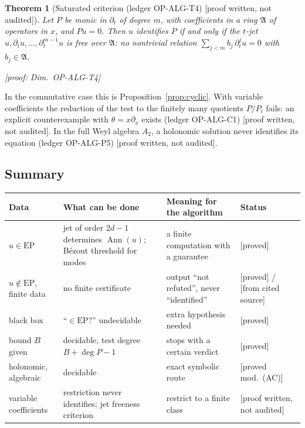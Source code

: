 \documentclass[11pt]{article}
\theoremstyle{plain}
\newtheorem{theorem}{Theorem}[section]
\theoremstyle{definition}
\theoremstyle{remark}
\DeclareMathOperator{\Ann}{Ann}             %
\newcommand{\EP}{\mathrm{EP}}               %
\newcommand{\badge}[2]{\textcolor{#1}{\textsf{\footnotesize[#2]}}}
\newcommand{\proved}[1][]{\badge{cC}{proved#1}}
\newcommand{\modulo}[1]{\badge{cD}{proved mod.\ #1}}
\newcommand{\led}[1]{\textcolor{cG}{\textsf{\footnotesize(ledger #1)}}}
\newcommand{\dimref}[1]{\textsf{\footnotesize[proof: Dim.~#1]}}
\newcommand{\pw}{\badge{cD}{proof written, not audited}}
\newcommand{\cf}{\badge{cD}{from cited source}}
\begin{document}
\begin{theorem}[{Saturated criterion \led{OP-ALG-T4} \pw}]\label{thm:sat}
Let $P$ be monic in $\partial_t$ of degree $m$, with coefficients in a ring $\mathfrak A$ of operators in $x$, and $Pu=0$. Then $u$ identifies $P$ if and only if the $t$-jet $u,\partial_tu,\dots,\partial_t^{m-1}u$ is free over $\mathfrak A$: no nontrivial relation $\sum_{j<m}b_j\,\partial_t^ju=0$ with $b_j\in\mathfrak A$.

\dimref{OP-ALG-T4}
\end{theorem}

In the commutative case this is Proposition~\ref{prop:cyclic}. With variable coefficients the reduction of the test to the finitely many quotients $P/P_i$ fails: an explicit counterexample with $\theta=x\partial_x$ exists \led{OP-ALG-C1} \pw. In the full Weyl algebra $A_2$, a holonomic solution never identifies its equation \led{OP-ALG-P5} \pw.

\subsection{Summary}

\begin{center}\small
\begin{tabular}{@{}L{3.0cm}L{5.2cm}L{4.4cm}L{2.0cm}@{}}
\toprule
Data & What can be done & Meaning for the algorithm & Status\\\midrule
$u\in\EP$ & jet of order $2d-1$ determines $\Ann(u)$; Bézout threshold for modes & a finite computation with a guarantee & \proved\\
$u\notin\EP$, finite data & no finite certificate & output ``not refuted'', never ``identified'' & \proved{} / \cf\\
black box & ``$\in\EP$?'' undecidable & extra hypothesis needed & \proved\\
bound $B$ given & decidable, test degree $B+\deg P-1$ & stops with a certain verdict & \proved\\
holonomic, algebraic & decidable & exact symbolic route & \modulo{(AC)}\\
variable coefficients & restriction never identifies; jet freeness criterion & restrict to a finite class & \pw\\\bottomrule
\end{tabular}
\label{tab:limits}
\end{center}
\end{document}
